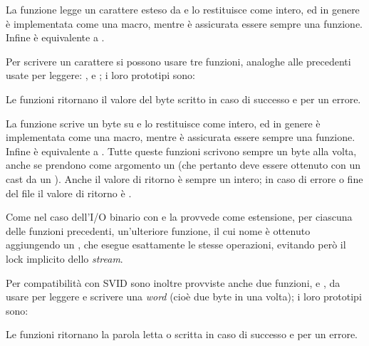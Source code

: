 La funzione  legge un carattere esteso da  e lo
restituisce come intero, ed in genere è implementata come una macro, mentre
 è assicurata essere sempre una funzione. Infine 
è equivalente a .

Per scrivere un carattere si possono usare tre funzioni, analoghe alle
precedenti usate per leggere: ,  e ; i
loro prototipi sono:

\begin{funcproto}{
}

{Le funzioni ritornano il valore del byte scritto in caso di successo e
   per un errore.}  
\end{funcproto}

La funzione  scrive un byte su  e lo restituisce come
intero, ed in genere è implementata come una macro, mentre  è
assicurata essere sempre una funzione. Infine  è equivalente a
.  Tutte queste funzioni scrivono sempre un byte alla
volta, anche se prendono come argomento un  (che pertanto deve
essere ottenuto con un cast da un ). Anche il valore di
ritorno è sempre un intero; in caso di errore o fine del file il valore di
ritorno è .

Come nel caso dell'I/O binario con  e  la 
provvede come estensione, per ciascuna delle funzioni precedenti,
un'ulteriore funzione, il cui nome è ottenuto aggiungendo un
, che esegue esattamente le stesse operazioni, evitando però
il lock implicito dello \textit{stream}.

Per compatibilità con SVID sono inoltre provviste anche due funzioni,
 e , da usare per leggere e scrivere una \textit{word}
(cioè due byte in una volta); i loro prototipi sono:

\begin{funcproto}{
}

{Le funzioni ritornano la parola letta o scritta in caso di successo e
   per un errore.}
\end{funcproto}

